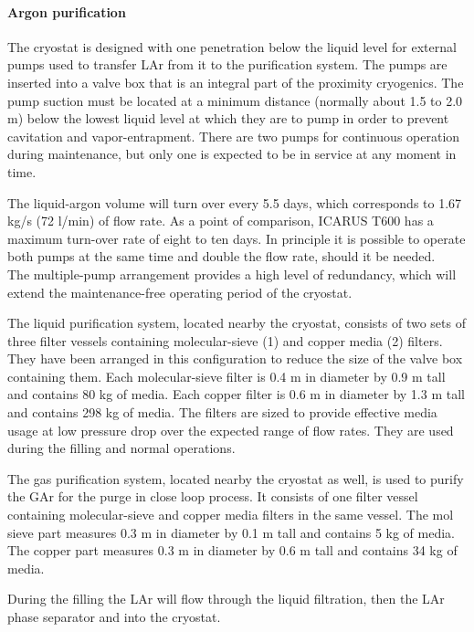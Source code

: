 \paragraph{Argon purification}

The cryostat is designed with one penetration below the liquid level for external pumps used to transfer LAr from it to the purification system. The pumps are inserted into a valve box that is an integral part of the proximity cryogenics. The pump suction must be located at a minimum distance (normally about 1.5 to 2.0 m) below the lowest liquid level at which they are to pump in order to prevent cavitation and vapor-entrapment. There are two pumps for continuous operation during maintenance, but only one is expected to be in service at any moment in time.

The liquid-argon volume will turn over every 5.5 days, which corresponds to 1.67 kg/s (72 l/min) of flow rate. As a point of comparison, ICARUS T600 has a maximum turn-over rate of eight to ten days. In principle it is possible to operate both pumps at the same time and double the flow rate, should it be needed.\\
%
The multiple-pump arrangement provides a high level of redundancy, which will extend the maintenance-free operating period of the cryostat.

The liquid purification system, located nearby the cryostat, consists of two sets of three filter vessels containing molecular-sieve (1) and copper media (2) filters. They have been arranged in this configuration to reduce the size of the valve box containing them. Each molecular-sieve filter is 0.4 m in diameter by 0.9 m tall and contains 80 kg of media. Each copper filter is 0.6 m in diameter by 1.3 m tall and contains 298 kg of media. The filters are sized to provide effective media usage at low pressure drop over the expected range of flow rates. They are used during the filling and normal operations.

The gas purification system, located nearby the cryostat as well, is used to purify the GAr for the purge in close loop process. It consists of one filter vessel containing molecular-sieve and copper media filters in the same vessel. The mol sieve part measures 0.3 m in diameter by 0.1 m tall and contains 5 kg of media. The copper part measures 0.3 m in diameter by 0.6 m tall and contains 34 kg of media.

During the filling the LAr will flow through the liquid filtration, then the LAr phase separator and into the cryostat.

